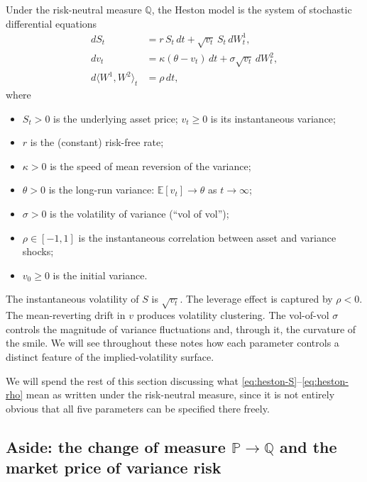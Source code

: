 \documentclass[11pt]{article}
\theoremstyle{plain}
\theoremstyle{definition}
\theoremstyle{remark}
\begin{document}
Under the risk-neutral measure \(\mathbb{Q}\), the Heston model is the system of stochastic differential equations
\begin{align}
    dS_t &= r\,S_t\,dt + \sqrt{v_t}\,S_t\,dW^1_t,                                       \label{eq:heston-S} \\
    dv_t &= \kappa(\theta - v_t)\,dt + \sigma\sqrt{v_t}\,dW^2_t,                        \label{eq:heston-v} \\
    d\langle W^1, W^2\rangle_t &= \rho\,dt,                                             \label{eq:heston-rho}
\end{align}
where
\begin{itemize}[topsep=2pt]
    \item \(S_t > 0\) is the underlying asset price; \(v_t \geq 0\) is its instantaneous variance;
    \item \(r\) is the (constant) risk-free rate;
    \item \(\kappa > 0\) is the speed of mean reversion of the variance;
    \item \(\theta > 0\) is the long-run variance: \(\mathbb{E}[v_t] \to \theta\) as \(t \to \infty\);
    \item \(\sigma > 0\) is the volatility of variance (``vol of vol'');
    \item \(\rho \in [-1, 1]\) is the instantaneous correlation between asset and variance shocks;
    \item \(v_0 \geq 0\) is the initial variance.
\end{itemize}

The instantaneous volatility of \(S\) is \(\sqrt{v_t}\). The leverage effect is captured by \(\rho < 0\). The mean-reverting drift in \(v\) produces volatility clustering. The vol-of-vol \(\sigma\) controls the magnitude of variance fluctuations and, through it, the curvature of the smile. We will see throughout these notes how each parameter controls a distinct feature of the implied-volatility surface.

We will spend the rest of this section discussing what \eqref{eq:heston-S}--\eqref{eq:heston-rho} mean as written under the risk-neutral measure, since it is not entirely obvious that all five parameters can be specified there freely.

\subsection*{Aside: the change of measure \texorpdfstring{$\mathbb{P} \to \mathbb{Q}$}{P -> Q} and the market price of variance risk}
\end{document}
